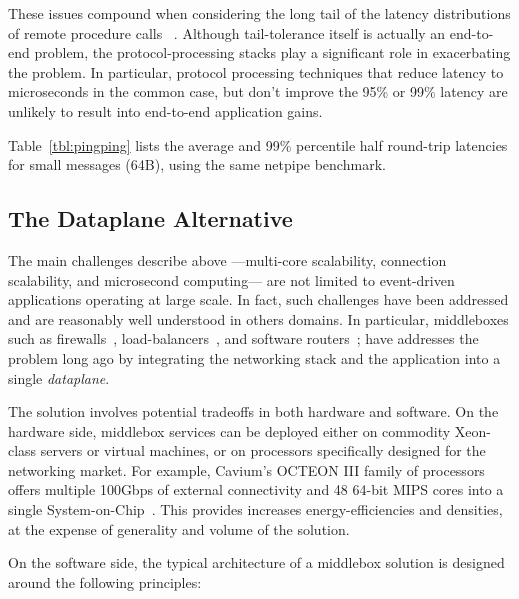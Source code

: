 These issues compound when considering the long tail of the latency
distributions of remote procedure
calls~\cite{DBLP:journals/cacm/DeanB13} . Although tail-tolerance
itself is actually an end-to-end problem, the protocol-processing
stacks play a significant role in exacerbating the problem.  In
particular, protocol processing techniques that reduce latency to
microseconds in the common case, but don't improve the 95\% or 99\%
latency are unlikely to result into end-to-end application gains.

Table~\ref{tbl:pingping} lists the average and 99\% percentile half
round-trip latencies for small messages (64B), using the same netpipe
benchmark.  


\subsection{The Dataplane Alternative}
\label{sec:motivation:dp}

The main challenges describe above ---multi-core scalability,
connection scalability, and microsecond computing--- are not limited
to event-driven applications operating at large scale.  In fact, such
challenges have been addressed and are reasonably well understood in
others domains.  In particular, middleboxes such as
firewalls~\cite{missing}, load-balancers~\cite{missing}, and software
routers~\cite{DBLP:journals/tocs/KohlerMCJK00,DBLP:conf/sosp/DobrescuEACFIKMR09};
have addresses the problem long ago by integrating the networking
stack and the application into a single \emph{dataplane}.

The solution involves potential tradeoffs in both hardware and
software.  On the hardware side, middlebox services can be deployed
either on commodity Xeon-class servers or virtual machines, or on
processors specifically designed for the networking market.  For
example, Cavium's OCTEON III family of processors offers multiple
100Gbps of external connectivity and 48 64-bit MIPS cores into a
single System-on-Chip~\cite{cavium-octeon}.  This provides increases
energy-efficiencies and densities, at the expense of generality and
volume of the solution.  

On the software side, the typical architecture of a middlebox solution
is designed around the following principles: 

